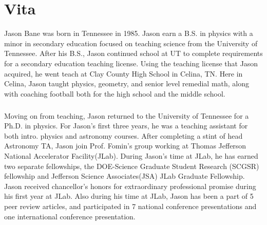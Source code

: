 \chapter*{Vita} \label{ch:vita}

Jason Bane was born in Tennessee in 1985. Jason earn a B.S. in physics with a minor in secondary education focused on teaching science from the University of Tennessee. After his B.S., Jason continued school at UT to complete requirements for a secondary education teaching license. Using the teaching license that Jason acquired, he went teach at Clay County High School in Celina, TN. Here in Celina, Jason taught physics, geometry, and senior level remedial math, along with coaching football both for the high school and the middle school. 
\paragraph{}Moving on from teaching, Jason returned to the University of Tennessee for a Ph.D. in physics. For Jason's first three years, he was a teaching assistant for both intro. physics and astronomy courses. After completing a stint of head Astronomy TA, Jason join Prof. Fomin's group working at Thomas Jefferson National Accelerator Facility(JLab). During Jason's time at JLab, he has earned two separate fellowships, the DOE-Science Graduate Student Research (SCGSR) fellowship and Jefferson Science Associates(JSA) JLab Graduate Fellowship. Jason received chancellor’s honors for extraordinary professional promise during his first year at JLab.  Also during his time at JLab, Jason has been a part of 5 peer review articles, and participated in 7 national conference presentations and one international conference presentation. 





